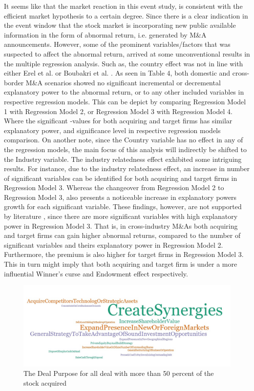 \documentclass[preprint,10pt]{elsarticle}
\begin{document}
It seems like that the market reaction in this event study, is consistent with the efficient market hypothesis to a certain degree. Since there is a clear indication in the event window that the stock market is incorporating new public available information in the form of abnormal return, i.e. generated by M\&A announcements. However, some of the prominent variables/factors that was suspected to affect the abnormal return, arrived at some unconventional results in the multiple regression analysis. Such as, the country effect was not in line with either Erel et al. or Boubakri et al. \cite{erel2012,BOUBAKRI20121}. As seen in Table 4, both domestic and cross-border M\&A scenarios showed no significant incremental or decremental explanatory power to the abnormal return, or to any other included variables in respective regression models. This can be depict by comparing Regression Model 1 with Regression Model 2, or Regression Model 3 with Regression Model 4. Where the significant -values for both acquiring and target firms has similar explanatory power, and significance level in respective regression models comparison. On another note, since the Country variable has no effect in any of the regression models, the main focus of this analysis will indirectly be shifted to the Industry variable. The industry relatedness effect exhibited some intriguing results. For instance, due to the industry relatedness effect, an increase in number of significant variables can be identified for both acquiring and target firms in Regression Model 3. Whereas the changeover from Regression Model 2 to Regression Model 3, also presents a noticeable increase in explanatory powers growth for each significant variable. These findings, however, are not supported by literature \cite{scanlon1989,bley2003,LIM2016,amewu}, since there are more significant variables with high explanatory power in Regression Model 3. That is, in cross-industry M\&As both acquiring and target firms can gain higher abnormal returns, compared to the number of significant variables and theirs explanatory power in Regression Model 2. Furthermore, the premium is also higher for target firms in Regression Model 3. This in turn might imply that both acquiring and target firm is under a more influential Winner's curse and Endowment effect respectively.
\begin{figure}
    \centering
    \includegraphics{ColumnX.jpg}
    \caption{The Deal Purpose for all deal with more than 50 percent of the stock acquired}
    \label{FigThePurpose}
\end{figure}{}
\end{document}
